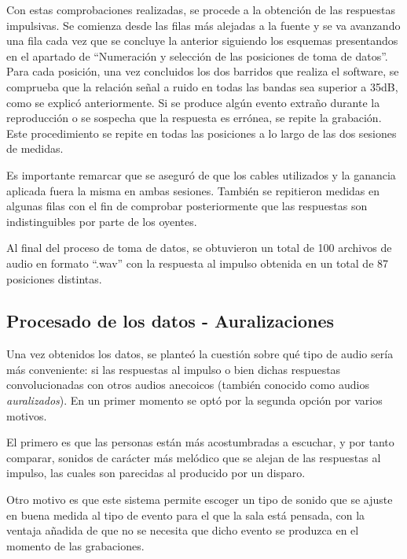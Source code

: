 \documentclass[11pt,a4paper]{book}
\begin{document}
            Con estas comprobaciones realizadas, se procede a la obtención de las respuestas impulsivas. Se comienza desde las filas más alejadas a la fuente y se va avanzando una fila cada vez que se concluye la anterior siguiendo los esquemas presentandos en el apartado de ``Numeración y selección de las posiciones de toma de datos''. Para cada posición, una vez concluidos los dos barridos que realiza el software, se comprueba que la relación señal a ruido en todas las bandas sea superior a 35dB, como se explicó anteriormente. Si se produce algún evento extraño durante la reproducción o se sospecha que la respuesta es errónea, se repite la grabación. Este procedimiento se repite en todas las posiciones a lo largo de las dos sesiones de medidas.
        
            Es importante remarcar que se aseguró de que los cables utilizados y la ganancia aplicada fuera la misma en ambas sesiones. También se repitieron medidas en algunas filas con el fin de comprobar posteriormente que las respuestas son indistinguibles por parte de los oyentes.
        
            Al  final del proceso de toma de datos, se obtuvieron un total de 100 archivos de audio en formato ``.wav'' con la respuesta al impulso obtenida en un total de 87 posiciones distintas.
            
            \subsection{Procesado de los datos - Auralizaciones}
                Una vez obtenidos los datos, se planteó la cuestión sobre qué tipo de audio sería más conveniente: si las respuestas al impulso o bien dichas respuestas convolucionadas con otros audios anecoicos (también conocido como audios \textit{auralizados}). En un primer momento se optó por la segunda opción por varios motivos.
        
                El primero es que las personas están más acostumbradas a escuchar, y por tanto comparar, sonidos de carácter más melódico que se alejan de las respuestas al impulso, las cuales son parecidas al producido por un disparo.
        
                Otro motivo es que este sistema permite escoger un tipo de sonido que se ajuste en buena medida al tipo de evento para el que la sala está pensada, con la ventaja añadida de que no se necesita que dicho evento se produzca en el momento de las grabaciones.
        
\end{document}
